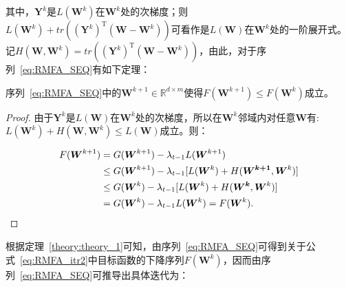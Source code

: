 
其中，$\boldsymbol{Y}^k$是$L(\boldsymbol{W}^k)$在$\boldsymbol{W}^k$处的次梯度；则$L(\boldsymbol{W}^k)+tr\left( \left( \boldsymbol{Y}^k \right) ^\mathrm{T} \left(\boldsymbol{W}-\boldsymbol{W}^k \right)\right)$可看作是$L(\boldsymbol{W})$在$\boldsymbol{W}^k$处的一阶展开式。记$H(\boldsymbol{W},\boldsymbol{W}^k)=tr\left( \left( \boldsymbol{Y}^k \right) ^\mathrm{T} \left(\boldsymbol{W}-\boldsymbol{W}^k \right)\right)$，由此，对于序列~\eqref{eq:RMFA_SEQ}有如下定理：

\begin{theorem}
\label{theory:theory_1}
   序列~\eqref{eq:RMFA_SEQ}中的$\boldsymbol{W}^{k+1} \in \mathbb{R}^{d \times m}$使得$F(\boldsymbol{W}^{k+1})\leq F(\boldsymbol{W}^k)$成立。 
\end{theorem}

\begin{proof}
由于$\boldsymbol{Y}^k$是$L(\boldsymbol{W})$在$\boldsymbol{W}^k$处的次梯度，所以在$\boldsymbol{W}^k$邻域内对任意$\boldsymbol{W}$有:
$ L(\boldsymbol{W}^k)+H(\boldsymbol{W},\boldsymbol{W}^k) \leq L(\boldsymbol{W}) $成立。则：

\begin{equation}\label{ineq::INEQ12}
\begin{aligned}
F(\boldsymbol{W}^{k+1})&=G(\boldsymbol{W}^{k+1})-\lambda_{t-1} L(\boldsymbol{W}^{k+1})\notag\\
&\leq G(\boldsymbol{W}^{k+1})-\lambda_{t-1} [ L(\boldsymbol{W}^k)+H(\boldsymbol{W^{k+1}},\boldsymbol{W}^k)]\notag\\
&\leq G(\boldsymbol{W}^{k})-\lambda_{t-1} [ L(\boldsymbol{W}^k)+H(\boldsymbol{W^k},\boldsymbol{W}^k)]\notag\\
&=G(\boldsymbol{W}^k)-\lambda_{t-1} L(\boldsymbol{W}^k)=F(\boldsymbol{W}^k).
\end{aligned}
\end{equation}
\end{proof}

根据定理~\eqref{theory:theory_1}可知，由序列~\eqref{eq:RMFA_SEQ}可得到关于公式~\eqref{eq:RMFA_itr2}中目标函数的下降序列$F(\boldsymbol{W}^k)$，因而由序列~\eqref{eq:RMFA_SEQ}可推导出具体迭代为：

